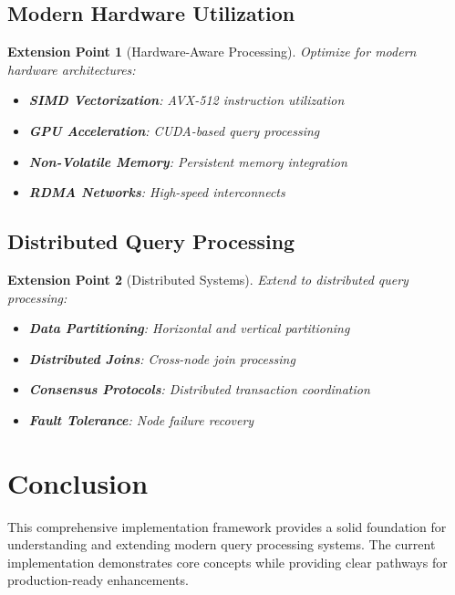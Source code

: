 \documentclass[12pt,a4paper]{article}
\newtheorem{extension}{Extension Point}[section]
\begin{document}
    \subsection{Modern Hardware Utilization}

    \begin{extension}[Hardware-Aware Processing]
        Optimize for modern hardware architectures:

        \begin{itemize}
            \item \textbf{SIMD Vectorization}: AVX-512 instruction utilization
            \item \textbf{GPU Acceleration}: CUDA-based query processing
            \item \textbf{Non-Volatile Memory}: Persistent memory integration
            \item \textbf{RDMA Networks}: High-speed interconnects
        \end{itemize}
    \end{extension}

    \subsection{Distributed Query Processing}

    \begin{extension}[Distributed Systems]
        Extend to distributed query processing:

        \begin{itemize}
            \item \textbf{Data Partitioning}: Horizontal and vertical partitioning
            \item \textbf{Distributed Joins}: Cross-node join processing
            \item \textbf{Consensus Protocols}: Distributed transaction coordination
            \item \textbf{Fault Tolerance}: Node failure recovery
        \end{itemize}
    \end{extension}

    \section{Conclusion}

    This comprehensive implementation framework provides a solid foundation for understanding and extending modern query processing systems. The current implementation demonstrates core concepts while providing clear pathways for production-ready enhancements.
\end{document}
